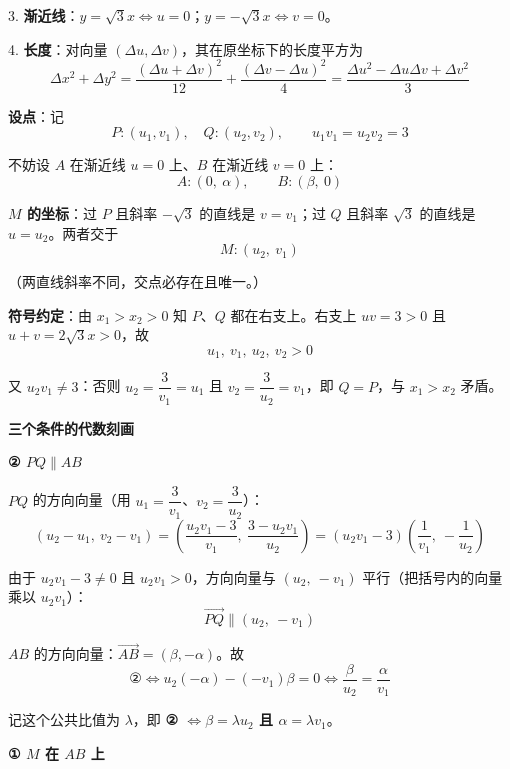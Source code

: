 \begin{answer}
3. \textbf{渐近线}：$y=\sqrt3x\iff u=0$；$y=-\sqrt3x\iff v=0$。

4. \textbf{长度}：对向量 $(\Delta u,\Delta v)$，其在原坐标下的长度平方为
\nopagebreak[4]
\[\Delta x^{2}+\Delta y^{2}=\frac{(\Delta u+\Delta v)^{2}}{12}+\frac{(\Delta v-\Delta u)^{2}}4=\frac{\Delta u^{2}-\Delta u\Delta v+\Delta v^{2}}3\]

\textbf{设点}：记
\nopagebreak[4]
\[P:\left(u_1,v_1\right),\quad Q:\left(u_2,v_2\right),\qquad u_1v_1=u_2v_2=3\]

不妨设 $A$ 在渐近线 $u=0$ 上、$B$ 在渐近线 $v=0$ 上：
\nopagebreak[4]
\[A:(0,\ \alpha),\qquad B:(\beta,\ 0)\]

\textbf{$M$ 的坐标}：过 $P$ 且斜率 $-\sqrt3$ 的直线是 $v=v_1$；过 $Q$ 且斜率 $\sqrt3$ 的直线是 $u=u_2$。两者交于
\nopagebreak[4]
\[\boxed{M:\left(u_2,\ v_1\right)}\]

（两直线斜率不同，交点必存在且唯一。）

\textbf{符号约定}：由 $x_1>x_2>0$ 知 $P$、$Q$ 都在右支上。右支上 $uv=3>0$ 且 $u+v=2\sqrt3x>0$，故
\nopagebreak[4]
\[u_1,\ v_1,\ u_2,\ v_2>0\]

又 $u_2v_1\ne3$：否则 $u_2=\dfrac3{v_1}=u_1$ 且 $v_2=\dfrac3{u_2}=v_1$，即 $Q=P$，与 $x_1>x_2$ 矛盾。

\par\medskip

\textbf{三个条件的代数刻画}

\textbf{② $PQ\parallel AB$}

$PQ$ 的方向向量（用 $u_1=\dfrac3{v_1}$、$v_2=\dfrac3{u_2}$）：
\nopagebreak[4]
\[\left(u_2-u_1,\ v_2-v_1\right)=\left(\frac{u_2v_1-3}{v_1},\ \frac{3-u_2v_1}{u_2}\right)=\left(u_2v_1-3\right)\left(\frac1{v_1},\ -\frac1{u_2}\right)\]

由于 $u_2v_1-3\ne0$ 且 $u_2v_1>0$，方向向量与 $\left(u_2,\ -v_1\right)$ 平行（把括号内的向量乘以 $u_2v_1$）：
\nopagebreak[4]
\[\overrightarrow{PQ}\parallel\left(u_2,\ -v_1\right)\]

$AB$ 的方向向量：$\overrightarrow{AB}=(\beta,-\alpha)$。故
\nopagebreak[4]
\[\text{②}\iff u_2(-\alpha)-\left(-v_1\right)\beta=0\iff\frac\beta{u_2}=\frac\alpha{v_1}\]

记这个公共比值为 $\lambda$，即 \textbf{② $\iff\beta=\lambda u_2$ 且 $\alpha=\lambda v_1$}。

\textbf{① $M$ 在 $AB$ 上}


\end{answer}
